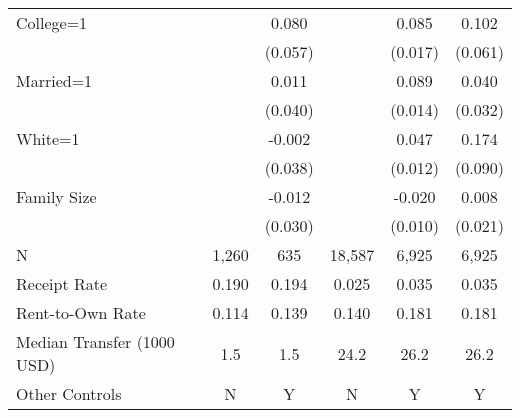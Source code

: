 {\begin{tabular}{l*{5}{c}}
\;College=1     &                  &    0.080         &                  &    0.085\sym{***}&    0.102\sym{+}  \\
                &                  &  (0.057)         &                  &  (0.017)         &  (0.061)         \\
\;Married=1     &                  &    0.011         &                  &    0.089\sym{***}&    0.040         \\
                &                  &  (0.040)         &                  &  (0.014)         &  (0.032)         \\
\;White=1       &                  &   -0.002         &                  &    0.047\sym{***}&    0.174\sym{+}  \\
                &                  &  (0.038)         &                  &  (0.012)         &  (0.090)         \\
\;Family Size   &                  &   -0.012         &                  &   -0.020\sym{*}  &    0.008         \\
                &                  &  (0.030)         &                  &  (0.010)         &  (0.021)         \\
\midrule
N               &    1,260         &      635         &   18,587         &    6,925         &    6,925         \\
Receipt Rate    &    0.190         &    0.194         &    0.025         &    0.035         &    0.035         \\
Rent-to-Own Rate&    0.114         &    0.139         &    0.140         &    0.181         &    0.181         \\
Median Transfer (1000 USD)&      1.5         &      1.5         &     24.2         &     26.2         &     26.2         \\
Other Controls  &        N         &        Y         &        N         &        Y         &        Y         \\
\bottomrule
\end{tabular}
}
